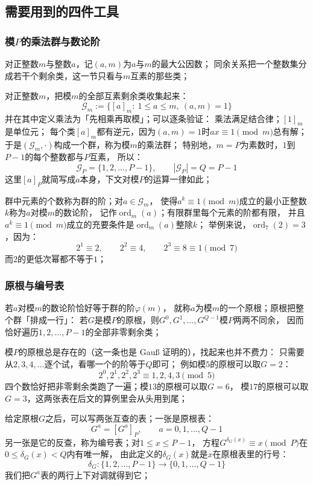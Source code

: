 \documentclass[UTF8,a4paper,11pt]{ctexart}
\begin{document}
\subsection{需要用到的四件工具}

\subsubsection{模$P$的乘法群与数论阶}
对正整数$m$与整数$a$，记$(a,m)$为$a$与$m$的最大公因数；
同余关系把一个整数集分成若干个剩余类，这一节只看与$m$互素的那些类；

对正整数$m$，把模$m$的全部互素剩余类收集起来：
\[
 \mathscr{G}_m:=\{[a]_m:\ 1\le a\le m,\ (a,m)=1\}
\]
并在其中定义乘法为「先相乘再取模」；可以逐条验证：
乘法满足结合律；$[1]_m$是单位元；
每个类$[a]_m$都有逆元，因为$(a,m)=1$时$ax\equiv1\pmod m$总有解；
于是$(\mathscr{G}_m,\cdot)$构成一个群，称为模$m$的乘法群；
特别地，$m=P$为素数时，$1$到$P-1$的每个整数都与$P$互素，
所以：
\[
 \mathscr{G}_P=\{1,2,\dots,P-1\},\qquad |\mathscr{G}_P|=Q=P-1
\]
这里$[a]_P$就简写成$a$本身，下文对模$P$的运算一律如此；\par

群中元素的个数称为群的阶；对$a\in\mathscr{G}_m$，
使得$a^{k}\equiv1\pmod m$成立的最小正整数$k$称为$a$对模$m$的数论阶，
记作$\operatorname{ord}_m(a)$；有限群里每个元素的阶都有限，
并且$a^k\equiv1\pmod m$成立的充要条件是$\operatorname{ord}_m(a)$整除$k$；
举例来说，$\operatorname{ord}_7(2)=3$，因为：
\[
 2^1\equiv2,\qquad 2^2\equiv4,\qquad 2^3\equiv8\equiv1\pmod7
\]
而$2$的更低次幂都不等于$1$；\par

\subsubsection{原根与编号表}
若$a$对模$m$的数论阶恰好等于群的阶$\varphi(m)$，
就称$a$为模$m$的一个原根；原根把整个群「排成一行」：
若$G$是模$P$的原根，则$G^0,G^1,\dots,G^{Q-1}$模$P$两两不同余，
因而恰好遍历$1,2,\dots,P-1$的全部非零剩余类；

模$P$的原根总是存在的（这一条也是 Gauß 证明的），找起来也并不费力：
只需要从$2,3,4,\dots$逐个试，看哪一个的阶等于$Q$即可；
例如模$5$的原根可以取$G=2$：
\[
 2^0,2^1,2^2,2^3\equiv1,2,4,3\pmod5
\]
四个数恰好把非零剩余类跑了一遍；模$13$的原根可以取$G=6$，
模$17$的原根可以取$G=3$，这两张表在后文的算例里会从头用到尾；\par

给定原根$G$之后，可以写两张互查的表；一张是原根表：
\[
 G^a=[G^a]_P,\qquad a=0,1,\dots,Q-1
\]
另一张是它的反查，称为编号表；对$1\le x\le P-1$，
方程$G^{\delta_G(x)}\equiv x\pmod P$在$0\le\delta_G(x)<Q$内有唯一解，
由此定义的$\delta_G(x)$就是$x$在原根表里的行号：
\[
 \delta_G:\{1,2,\dots,P-1\}\longrightarrow\{0,1,\dots,Q-1\}
\]
我们把$G^a$表的两行上下对调就得到它；\par
\end{document}
